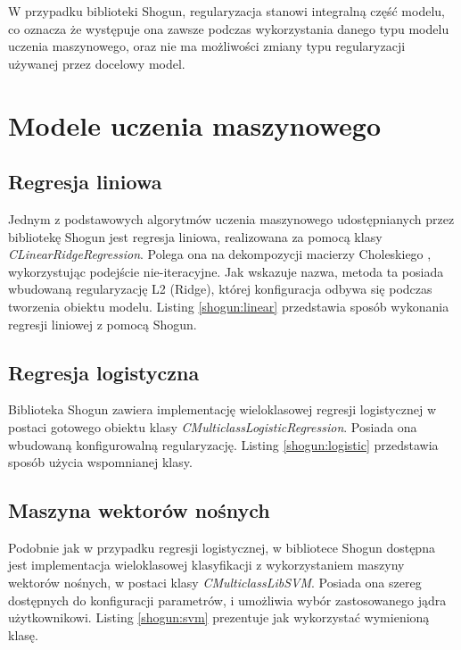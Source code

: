 W przypadku biblioteki Shogun, regularyzacja stanowi integralną część modelu, co oznacza że występuje ona zawsze podczas wykorzystania danego typu modelu uczenia maszynowego, oraz nie ma możliwości zmiany typu regularyzacji używanej przez docelowy model.

\section{Modele uczenia maszynowego}
\subsection{Regresja liniowa}
Jednym z podstawowych algorytmów uczenia maszynowego udostępnianych przez bibliotekę Shogun jest regresja liniowa, realizowana za pomocą klasy \textit{CLinearRidgeRegression}. Polega ona na dekompozycji macierzy Choleskiego \cite{handsOnMachineLearning}, wykorzystując podejście nie-iteracyjne. Jak wskazuje nazwa, metoda ta posiada wbudowaną regularyzację L2 (Ridge), której konfiguracja odbywa się podczas tworzenia obiektu modelu. Listing \ref{shogun:linear} przedstawia sposób wykonania regresji liniowej z pomocą Shogun.


\subsection{Regresja logistyczna}
Biblioteka Shogun zawiera implementację wieloklasowej regresji logistycznej w postaci gotowego obiektu klasy \textit{CMulticlassLogisticRegression}. Posiada ona wbudowaną konfigurowalną regularyzację. Listing \ref{shogun:logistic} przedstawia sposób użycia wspomnianej klasy.


\subsection{Maszyna wektorów nośnych}
Podobnie jak w przypadku regresji logistycznej, w bibliotece Shogun dostępna jest implementacja wieloklasowej klasyfikacji z wykorzystaniem maszyny wektorów nośnych, w postaci klasy \textit{CMulticlassLibSVM}. Posiada ona szereg dostępnych do konfiguracji parametrów, i umożliwia wybór zastosowanego jądra użytkownikowi. Listing \ref{shogun:svm} prezentuje jak wykorzystać wymienioną klasę.

